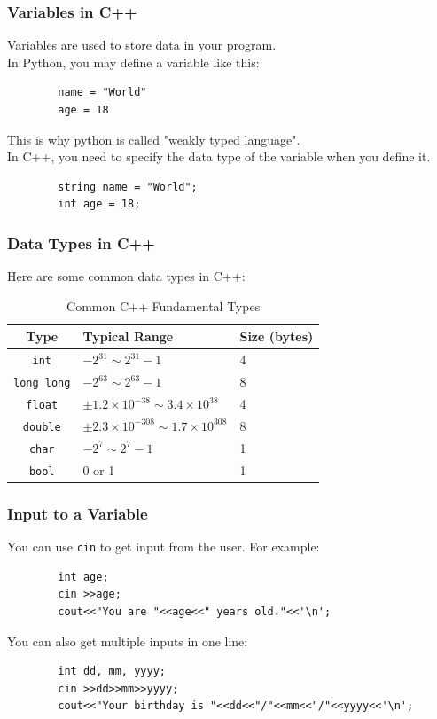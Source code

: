 \documentclass[xcolor=dvipsnames]{beamer}
\begin{document}
    \begin{frame}[fragile]
        \frametitle{Variables in C++}
        Variables are used to store data in your program.\\
        In Python, you may define a variable like this:
        \begin{verbatim}
        name = "World"
        age = 18
        \end{verbatim}
        This is why python is called "weakly typed language".\\
        In C++, you need to specify the data type of the variable when you define it.
        \begin{verbatim}
        string name = "World";
        int age = 18;
        \end{verbatim}
    \end{frame}

    \begin{frame}
        \frametitle{Data Types in C++}
        Here are some common data types in C++:
        \begin{table}[h]
        \centering
        \caption{Common C++ Fundamental Types}
        \begin{tabular}{cll}
        \toprule
        \textbf{Type} & \textbf{Typical Range} & \textbf{Size (bytes)} \\
        \midrule
        \texttt{int}        & $-2^{31}\sim 2^{31}-1$ & 4 \\
        \texttt{long long}  & $-2^{63}\sim 2^{63}-1$ & 8 \\
        \texttt{float}      & $\pm 1.2 \times 10^{-38}\sim 3.4 \times 10^{38}$ & 4 \\
        \texttt{double}     & $\pm 2.3 \times 10^{-308}\sim 1.7 \times 10^{308}$ & 8 \\
        \texttt{char}       & $-2^7\sim 2^7-1$ & 1 \\
        \texttt{bool}     & 0 or 1 & 1 \\
        \bottomrule
        \end{tabular}
        \end{table}        
    \end{frame}

    \begin{frame}[fragile]
        \frametitle{Input to a Variable}
        You can use \texttt{cin} to get input from the user. For example:
        \begin{verbatim}
        int age;
        cin >>age;
        cout<<"You are "<<age<<" years old."<<'\n';
        \end{verbatim}
        You can also get multiple inputs in one line:
        \begin{verbatim}
        int dd, mm, yyyy;
        cin >>dd>>mm>>yyyy;
        cout<<"Your birthday is "<<dd<<"/"<<mm<<"/"<<yyyy<<'\n';
        \end{verbatim}
    \end{frame}
\end{document}
